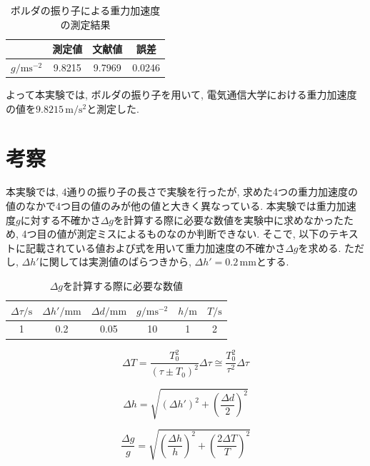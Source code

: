 \documentclass{jarticle}
\begin{document}
\begin{table}[h]
  \centering
  \caption{ボルダの振り子による重力加速度の測定結果}
  \begin{tabular}{cccc}
    \hline
    & 測定値 & 文献値\cite{uec-atom} & 誤差 \\
    \hline
    $g/\mathrm{ms^{-2}}$ & 9.8215 & 9.7969 & 0.0246 \\
    \hline
  \end{tabular}
\end{table}

よって本実験では, ボルダの振り子を用いて, 電気通信大学における重力加速度の値を$9.8215\,\mathrm{m/s^2}$と測定した.


\section{考察}


本実験では, 4通りの振り子の長さで実験を行ったが, 求めた4つの重力加速度の値のなかで4つ目の値のみが他の値と大きく異なっている.
本実験では重力加速度$g$に対する不確かさ$\Delta g$を計算する際に必要な数値を実験中に求めなかったため, 4つ目の値が測定ミスによるものなのか判断できない.
そこで, 以下のテキストに記載されている値および式を用いて重力加速度の不確かさ$\Delta g$を求める. ただし, $\Delta h'$に関しては実測値のばらつきから, $\Delta h'=0.2\,\mathrm{mm}$とする.

\begin{table}[h]
  \centering
  \caption{$\Delta g$を計算する際に必要な数値}
  \begin{tabular}{cccccc}
    \hline
    $\Delta\tau/\mathrm{s}$ & $\Delta h'/\mathrm{mm}$ & $\Delta d/\mathrm{mm}$ & $g/\mathrm{ms^{-2}}$ & $h/\mathrm{m}$ & $T/\mathrm{s}$ \\
    \hline
    1 & 0.2 & 0.05 & 10 & 1 & 2 \\
    \hline
  \end{tabular}
\end{table}


\begin{equation}
  \Delta T=\frac{T_0^2}{(\tau\pm T_0)^2}\Delta\tau\cong\frac{T_0^2}{\tau^2}\Delta\tau
\end{equation}

\begin{equation}
  \Delta h=\sqrt{(\Delta h')^2+\left(\frac{\Delta d}{2}\right)^2}
\end{equation}

\begin{equation}
  \frac{\Delta g}{g}=\sqrt{\left(\frac{\Delta h}{h}\right)^2+\left(\frac{2\Delta T}{T}\right)^2}
\end{equation}
\end{document}
